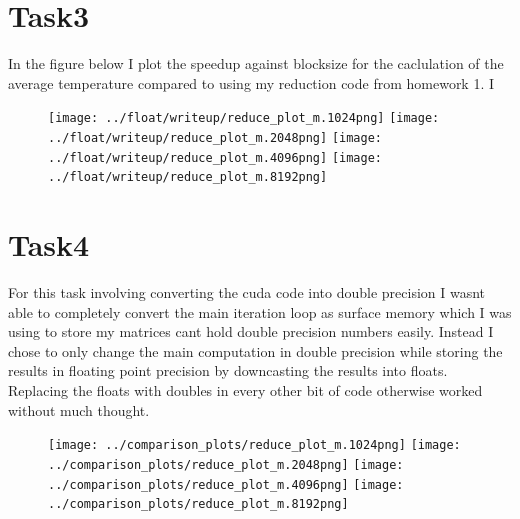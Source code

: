 \documentclass[a4paper]{article}
\begin{document}
\section{Task3}

	In the figure below I plot the speedup against blocksize for the
	caclulation of the average temperature  compared to using my reduction
	code from homework 1. I

	\begin{figure}[h!]
		\centering
		\texttt{[image: ../float/writeup/reduce\_plot\_m.1024png]}
		\texttt{[image: ../float/writeup/reduce\_plot\_m.2048png]}
		\texttt{[image: ../float/writeup/reduce\_plot\_m.4096png]}
		\texttt{[image: ../float/writeup/reduce\_plot\_m.8192png]}
	\end{figure}

\section{Task4}
	
	For this task involving converting the cuda code into double precision I wasnt able
	to completely convert the main iteration loop as surface memory which I was using 
	to store my matrices cant hold double precision numbers easily. Instead I chose to 
	only change the main computation in double precision while storing the results in 
	floating point precision by downcasting the results into floats. Replacing the floats
	with doubles in every other bit of code otherwise worked without much thought.


	\begin{figure}[h!]
		\centering
		\texttt{[image: ../comparison\_plots/reduce\_plot\_m.1024png]}
		\texttt{[image: ../comparison\_plots/reduce\_plot\_m.2048png]}
		\texttt{[image: ../comparison\_plots/reduce\_plot\_m.4096png]}
		\texttt{[image: ../comparison\_plots/reduce\_plot\_m.8192png]}
	\end{figure}




\end{document}
